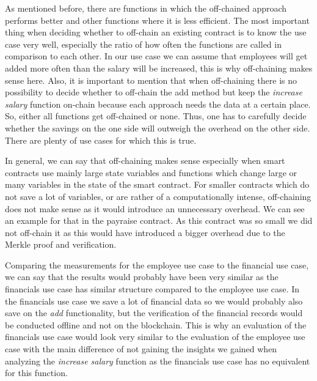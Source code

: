 As mentioned before, there are functions in which the off-chained approach performs better and other functions where it is less efficient.
The most important thing when deciding whether to off-chain an existing contract is to know the use case very well, especially the ratio of how often the functions are called in comparison to each other.
In our use case we can assume that employees will get added more often than the salary will be increased, this is why off-chaining makes sense here.
Also, it is important to mention that when off-chaining there is no possibility to decide whether to off-chain the add method but keep the \textit{increase salary} function on-chain because each approach needs the data at a certain place.
So, either all functions get off-chained or none.
Thus, one has to carefully decide whether the savings on the one side will outweigh the overhead on the other side.
There are plenty of use cases for which this is true.

In general, we can say that off-chaining makes sense especially when smart contracts use mainly large state variables and functions which change large or many variables in the state of the smart contract.
For smaller contracts which do not save a lot of variables, or are rather of a computationally intense, off-chaining does not make sense as it would introduce an unnecessary overhead.
We can see an example for that in the payraise contract.
As this contract was so small we did not off-chain it as this would have introduced a bigger overhead due to the Merkle proof and verification.

Comparing the measurements for the employee use case to the financial use case, we can say that the results would probably have been very similar as the financials use case has similar structure compared to the employee use case.
In the financials use case we save a lot of financial data so we would probably also save on the \textit{add} functionality, but the verification of the financial records would be conducted offline and not on the blockchain.
This is why an evaluation of the financials use case would look very similar to the evaluation of the employee use case with the main difference of not gaining the insights we gained when analyzing the \textit{increase salary} function as the financials use case has no equivalent for this function.

